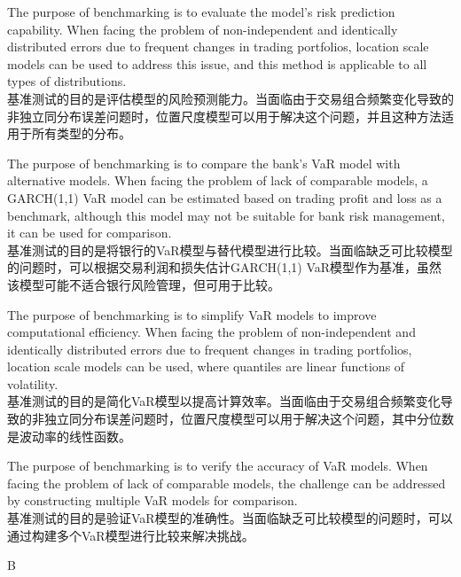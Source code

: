 \documentclass{article}
\begin{document}
\begin{choices}
    \item The purpose of benchmarking is to evaluate the model's risk prediction capability. When facing the problem of non-independent and identically distributed errors due to frequent changes in trading portfolios, location scale models can be used to address this issue, and this method is applicable to all types of distributions.\\
        基准测试的目的是评估模型的风险预测能力。当面临由于交易组合频繁变化导致的非独立同分布误差问题时，位置尺度模型可以用于解决这个问题，并且这种方法适用于所有类型的分布。
    \item The purpose of benchmarking is to compare the bank's VaR model with alternative models. When facing the problem of lack of comparable models, a GARCH(1,1) VaR model can be estimated based on trading profit and loss as a benchmark, although this model may not be suitable for bank risk management, it can be used for comparison.\\
        基准测试的目的是将银行的VaR模型与替代模型进行比较。当面临缺乏可比较模型的问题时，可以根据交易利润和损失估计GARCH(1,1) VaR模型作为基准，虽然该模型可能不适合银行风险管理，但可用于比较。
    \item The purpose of benchmarking is to simplify VaR models to improve computational efficiency. When facing the problem of non-independent and identically distributed errors due to frequent changes in trading portfolios, location scale models can be used, where quantiles are linear functions of volatility.\\
        基准测试的目的是简化VaR模型以提高计算效率。当面临由于交易组合频繁变化导致的非独立同分布误差问题时，位置尺度模型可以用于解决这个问题，其中分位数是波动率的线性函数。
    \item The purpose of benchmarking is to verify the accuracy of VaR models. When facing the problem of lack of comparable models, the challenge can be addressed by constructing multiple VaR models for comparison.\\
        基准测试的目的是验证VaR模型的准确性。当面临缺乏可比较模型的问题时，可以通过构建多个VaR模型进行比较来解决挑战。
\end{choices}

\begin{correctanswer}
    B
\end{correctanswer}
\end{document}
